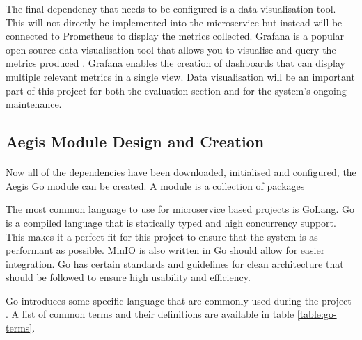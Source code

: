 \documentclass[12pt, conference, final, a4paper, onecolumn, compsoc]{IEEEtran}
\begin{document}
The final dependency that needs to be configured is a data visualisation tool.
This will not directly be implemented into the microservice but instead will be
connected to Prometheus to display the metrics collected. Grafana is a popular
open-source data visualisation tool that allows you to visualise and query the
metrics produced \citep{multi-cloud}. Grafana enables the creation of dashboards
that can display multiple relevant metrics in a single view. Data visualisation
will be an important part of this project for both the evaluation section and
for the system's ongoing maintenance.

\subsection{Aegis Module Design and Creation}
\paragraph{}

Now all of the dependencies have been downloaded, initialised and configured,
the Aegis Go module can be created. A module is a collection of packages

The most common language to use for microservice based projects is GoLang. Go is
a compiled language that is statically typed and high concurrency support. This
makes it a perfect fit for this project to ensure that the system is as
performant as possible. MinIO is also written in Go should allow for easier
integration. Go has certain standards and guidelines for clean architecture that
should be followed to ensure high usability and efficiency.

Go introduces some specific language that are commonly used during the project \citep{effective-go}.
A list of common terms and their definitions are available in table
\ref{table:go-terms}.
\end{document}
